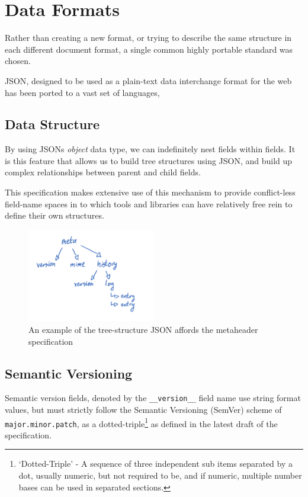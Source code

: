 \chapter{Data Formats}
\label{sec:DataFormats}

Rather than creating a new format, or trying to describe the same structure in each different document format, a single common highly portable standard was chosen.

JSON\cite{JSON}, designed to be used as a plain-text data interchange format for the web has been ported to a vast set of languages, 

\section{Data Structure}
By using JSONs \textit{object} data type, we can indefinitely nest fields within fields.
It is this feature that allows us to build tree structures using JSON, and build up complex relationships between parent and child fields.

This specification makes extensive use of this mechanism to provide conflict-less field-name spaces in to which tools and libraries can have relatively free rein to define their own structures.

\begin{figure}[ht!]
    \centering
    \includegraphics[width=0.5\textwidth]{diagrams/meta-tree.png}
    \caption{An example of the tree-structure JSON affords the metaheader specification}
    \label{structure:meta-tree}
\end{figure}

\section{Semantic Versioning}
\label{sec:SemanticVersioning}
Semantic version fields, denoted by the \texttt{\_\_version\_\_} field name use string format values, but must strictly follow the Semantic Versioning (SemVer) scheme of \texttt{major.minor.patch}, as a dotted-triple\footnote{`Dotted-Triple' - A sequence of three independent sub items separated by a dot, usually numeric, but not required to be, and if numeric, multiple number bases can be used in separated sections.} as defined in the latest draft of the specification.

